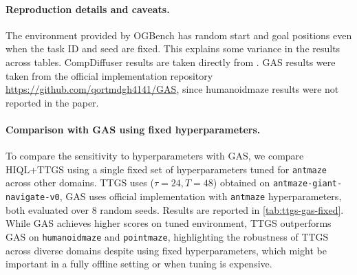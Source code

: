 \documentclass{article} %
\begin{document}
\paragraph{Reproduction details and caveats.} The environment provided by OGBench has random start and goal positions even when the task ID and seed are fixed. This explains some variance in the results across tables. CompDiffuser results are taken directly from \citet{Luo2025CompDiffuser}. GAS results were taken from the official implementation repository \href{https://github.com/qortmdgh4141/GAS}{https://github.com/qortmdgh4141/GAS}, since humanoidmaze results were not reported in the paper.

\paragraph{Comparison with GAS using fixed hyperparameters.}
To compare the sensitivity to hyperparameters with GAS, we compare HIQL+TTGS using a single fixed set of hyperparameters tuned for \texttt{antmaze} across other domains. TTGS uses ($\tau = 24, T = 48$) obtained on \texttt{antmaze-giant-navigate-v0}, GAS uses official implementation with \texttt{antmaze} hyperparameters, both evaluated over 8 random seeds. Results are reported in \autoref{tab:ttgs-gas-fixed}. While GAS achieves higher scores on tuned environment, TTGS outperforms GAS on \texttt{humanoidmaze} and \texttt{pointmaze}, highlighting the robustness of TTGS across diverse domains despite using fixed hyperparameters, which might be important in a fully offline setting or when tuning is expensive.
\end{document}
